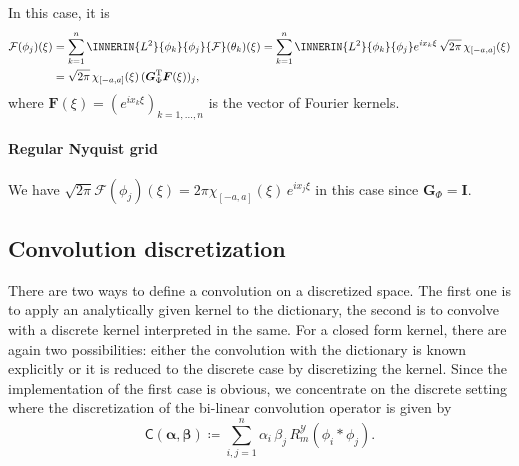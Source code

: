 \documentclass[a4paper]{paper}
\newcommand*{\SPC}[1]{{\ensuremath{\mathscr{#1}}}}
\newcommand*{\OP}[1]{{\ensuremath{\mathcal{#1}}}}
\newcommand{\DISCOP}[1]{{\ensuremath{\mathsf{#1}}}}
\newcommand*{\REST}[2]{\ensuremath{R_{#1}^{#2}}}
\newcommand*{\RmY}{{\ensuremath{\REST{m}{\SPC{Y}}}}}
\newcommand*{\FT}{\OP{F}}
\DeclareMathOperator{\DEFEQ}{{\coloneqq}}
\newcommand*{\TRANSP}[1]{{\ensuremath{#1^{\mathrm{T}}}}}
\newcommand*{\I}{\ensuremath{\mathit{i}}}
\newcommand*{\BDalpha}{\boldsymbol{\alpha}}
\newcommand*{\BDbeta}{\boldsymbol{\beta}}
\newcommand*{\BDF}{\boldsymbol{F}}
\newcommand*{\BDG}{\boldsymbol{G}}
\newcommand*{\BDI}{\boldsymbol{I}}
\begin{document}
In this case, it is
%
\begin{align*}
 \FT(\phi_j)(\xi) 
 &= \sum_{k=1}^n \INNERIN{L^2}{\phi_k}{\phi_j} \FT(\theta_k)(\xi)
 = \sum_{k=1}^n \INNERIN{L^2}{\phi_k}{\phi_j} e^{\I x_k \xi}\, \sqrt{2\pi}\, \chi_{[-a,a]}(\xi)\\
 &= \sqrt{2\pi}\, \chi_{[-a,a]}(\xi)\, (\TRANSP{\BDG_\Phi} \BDF(\xi))_j,
\end{align*}
%
where $\BDF(\xi) = (e^{\I x_k \xi})_{k=1,\dots,n}$ is the vector of Fourier kernels.\\[1em]

\paragraph{Regular Nyquist grid} 

We have $\sqrt{2\pi} \FT(\phi_j)(\xi) = 2\pi \chi_{[-a,a]}(\xi)\, e^{\I x_j \xi}$ in this case since $\BDG_\Phi = \BDI$.



\subsection{Convolution discretization}
\label{subsec:specif:conv}


There are two ways to define a convolution on a discretized space. The first one is to apply an analytically given 
kernel to the dictionary, the second is to convolve with a discrete kernel interpreted in the same. For a closed form 
kernel, there are again two possibilities: either the convolution with the dictionary is known explicitly or it is 
reduced to the discrete case by discretizing the kernel. Since the implementation of the first case is obvious, we 
concentrate on the discrete setting where the discretization of the bi-linear convolution operator is given by
%
\begin{equation*}
 \DISCOP{C}(\BDalpha, \BDbeta) \DEFEQ \sum_{i,j=1}^n \alpha_i\, \beta_j\, \RmY(\phi_i \ast \phi_j).
\end{equation*}
\end{document}
